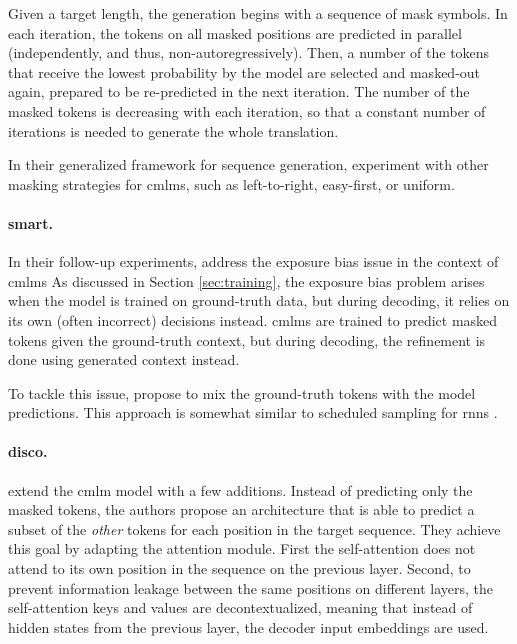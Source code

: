 Given a target length, the generation begins with a sequence of mask symbols.
In each iteration, the tokens on all masked positions are predicted in parallel
(independently, and thus, non-autoregressively). Then, a number of the tokens
that receive the lowest probability by the model are selected and masked-out
again, prepared to be re-predicted in the next iteration. The number of the
masked tokens is decreasing with each iteration, so that a constant number of
iterations is needed to generate the whole translation.

In their generalized framework for sequence generation,
\citet{mansimov2019generalized} experiment with other masking strategies for
\acp{cmlm}, such as left-to-right, easy-first, or uniform.

\paragraph{\Acl{smart}.} In their follow-up experiments,
\citet{ghazvininejad-etal-2020-semiautoregressive} address the exposure bias
issue in the context of \acp{cmlm}
As discussed in Section \ref{sec:training}, the exposure bias problem arises
when the model is trained on ground-truth data, but during decoding, it relies
on its own (often incorrect) decisions instead. \Acp{cmlm} are trained to
predict masked tokens given the ground-truth context, but during decoding, the
refinement is done using generated context instead.

To tackle this issue, \citet{ghazvininejad-etal-2020-semiautoregressive}
propose to mix the ground-truth tokens with the model predictions. This
approach is somewhat similar to scheduled sampling for \aclp{rnn}
\citep{bengio2015scheduled}.

\paragraph{\Acl{disco}.} \citet{kasai2020nonautoregressive} extend the
\ac{cmlm} model with a few additions. Instead of predicting only the masked
tokens, the authors propose an architecture that is able to predict a subset of
the \emph{other} tokens for each position in the target sequence. They achieve
this goal by adapting the attention module. First the self-attention does not
attend to its own position in the sequence on the previous layer. Second, to
prevent information leakage between the same positions on different layers, the
self-attention keys and values are decontextualized, meaning that instead of
hidden states from the previous layer, the decoder input embeddings are
used. 

